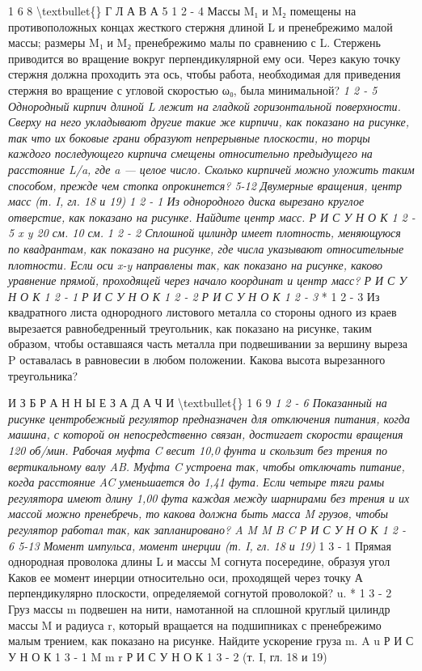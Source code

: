 \documentclass[10pt,oneside]{article}
\begin{document}
1 6 8 \textbackslash{}textbullet\{\} Г Л А В А  5 \emph{ } 1 2 - 4 Массы M₁ и M₂ помещены на противоположных концах жесткого стержня длиной L и пренебрежимо малой массы; размеры M₁ и M₂ пренебрежимо малы по сравнению с L. Стержень приводится во вращение вокруг перпендикулярной ему оси. Через какую точку стержня должна проходить эта ось, чтобы работа, необходимая для приведения стержня во вращение с угловой скоростью ω₀, была минимальной? \emph{ } \emph{ 1 2 - 5 Однородный кирпич длиной L лежит на гладкой горизонтальной поверхности. Сверху на него укладывают другие такие же кирпичи, как показано на рисунке, так что их боковые грани образуют непрерывные плоскости, но торцы каждого последующего кирпича смещены относительно предыдущего на расстояние L/a, где a --- целое число. Сколько кирпичей можно уложить таким способом, прежде чем стопка опрокинется? 5-12 Двумерные вращения, центр масс (т. I, гл. 18 и 19) } \emph{ 1 2 - 1 Из однородного диска вырезано круглое отверстие, как показано на рисунке. Найдите центр масс. Р И С У Н О К  1 2 - 5 x y 20 см. 10 см. } \emph{ 1 2 - 2 Сплошной цилиндр имеет плотность, меняющуюся по квадрантам, как показано на рисунке, где числа указывают относительные плотности. Если оси x-y направлены так, как показано на рисунке, каково уравнение прямой, проходящей через начало координат и центр масс? Р И С У Н О К  1 2 - 1 Р И С У Н О К  1 2 - 2 Р И С У Н О К  1 2 - 3 } * 1 2 - 3 Из квадратного листа однородного листового металла со стороны одного из краев вырезается равнобедренный треугольник, как показано на рисунке, таким образом, чтобы оставшаяся часть металла при подвешивании за вершину выреза P оставалась в равновесии в любом положении. Какова высота вырезанного треугольника?\par

И З Б Р А Н Н Ы Е  З А Д А Ч И \textbackslash{}textbullet\{\} 1 6 9 \emph{ } \emph{ 1 2 - 6 Показанный на рисунке центробежный регулятор предназначен для отключения питания, когда машина, с которой он непосредственно связан, достигает скорости вращения 120 об/мин. Рабочая муфта C весит 10,0 фунта и скользит без трения по вертикальному валу AB. Муфта C устроена так, чтобы отключать питание, когда расстояние AC уменьшается до 1,41 фута. Если четыре тяги рамы регулятора имеют длину 1,00 фута каждая между шарнирами без трения и их массой можно пренебречь, то какова должна быть масса M грузов, чтобы регулятор работал так, как запланировано? A M M B C Р И С У Н О К  1 2 - 6 5-13 Момент импульса, момент инерции (т. I, гл. 18 и 19) } 1 3 - 1 Прямая однородная проволока длины L и массы M согнута посередине, образуя угол Каков ее момент инерции относительно оси, проходящей через точку А перпендикулярно плоскости, определяемой согнутой проволокой? u. * 1 3 - 2 Груз массы m подвешен на нити, намотанной на сплошной круглый цилиндр массы M и радиуса r, который вращается на подшипниках с пренебрежимо малым трением, как показано на рисунке. Найдите ускорение груза m. A u Р И С У Н О К  1 3 - 1 M m r Р И С У Н О К  1 3 - 2 (т. I, гл. 18 и 19)\par
\end{document}
